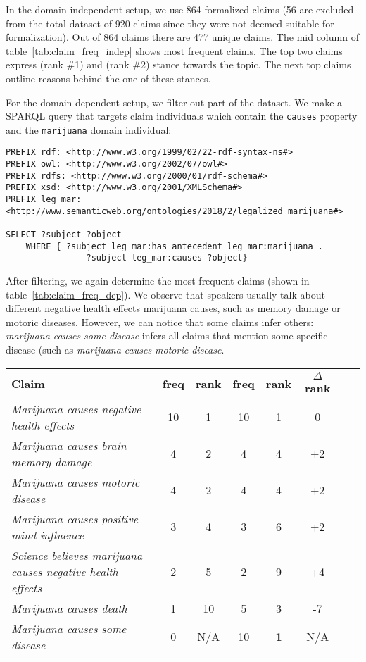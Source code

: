 In the domain independent setup, we use 864 formalized claims (56 are excluded
from the total dataset of 920 claims since they were not deemed
suitable for formalization). Out of 864 claims there are 477 unique claims. 
The mid column of table~\ref{tab:claim_freq_indep} shows most frequent claims.
The top two claims express  (rank \#1) and  (rank \#2) stance 
towards the topic. The next top claims outline reasons behind the one of these 
stances. 

For the domain dependent setup, we filter out part of the dataset. We make a
SPARQL query that targets claim individuals which contain the \texttt{causes} property
and the \texttt{marijuana} domain individual: 
{
\small{
\begin{verbatim}
PREFIX rdf: <http://www.w3.org/1999/02/22-rdf-syntax-ns#>
PREFIX owl: <http://www.w3.org/2002/07/owl#>
PREFIX rdfs: <http://www.w3.org/2000/01/rdf-schema#>
PREFIX xsd: <http://www.w3.org/2001/XMLSchema#>
PREFIX leg_mar:
<http://www.semanticweb.org/ontologies/2018/2/legalized_marijuana#>

SELECT ?subject ?object
	WHERE { ?subject leg_mar:has_antecedent leg_mar:marijuana .
                ?subject leg_mar:causes ?object}
\end{verbatim}
}
}

After filtering, we again determine the most frequent claims (shown in 
table~\ref{tab:claim_freq_dep}). We observe that speakers usually talk 
about different negative health effects marijuana causes, such as 
memory damage or motoric diseases. However, we can notice that 
some claims infer others: \emph{marijuana causes some disease} infers
all claims that mention some specific disease (such as 
\emph{marijuana causes motoric disease}. 

\begin{table*}[t]
\centering
\begin{tabular}{p{9 cm} | cc | cc | cc | c}
	\toprule
	\textbf{Claim} & freq & rank & freq & rank & $\Delta$rank \\
\midrule
	\emph{Marijuana causes negative health effects                  }& 10 & 1 & 10 & 1 & 0\\
	\emph{Marijuana causes brain memory damage                      }& 4 & 2 & 4 & 4 & +2\\
	\emph{Marijuana causes motoric disease                          }& 4 & 2 & 4 & 4 & +2\\
	\emph{Marijuana causes positive mind influence                  }& 3 & 4 & 3 & 6 & +2 \\
	\emph{Science believes marijuana causes negative health effects }& 2 & 5 & 2 & 9 & +4 \\
	\emph{Marijuana causes death                                    }& 1 & 10 & 5 & 3 & -7 \\
	\emph{Marijuana causes some disease                             }& 0 & N/A & 10 & \textbf{1} & N/A \\
\bottomrule 
\end{tabular}
\caption{Claim frequency in domain dependent setup. Frequency and rank are
	shown before and after adding inferred claims.  }
\label{tab:claim_freq_dep}
\end{table*}

